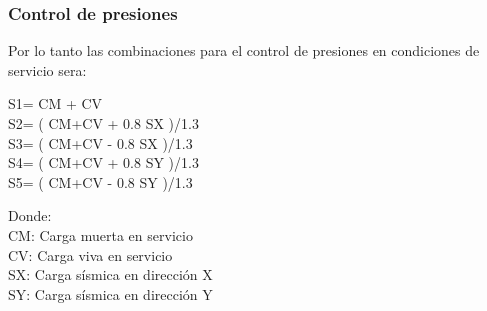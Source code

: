 \documentclass{article}%
\begin{document}
\subsubsection{Control de presiones}
\newpage
\noindent Por lo tanto las combinaciones para el control de presiones en condiciones de servicio sera:
\begin{center}
    S1= CM + CV\\
    S2= ( CM+CV + 0.8 SX )/1.3\\
    S3= ( CM+CV - 0.8 SX )/1.3\\
    S4= ( CM+CV + 0.8 SY )/1.3\\
    S5= ( CM+CV - 0.8 SY )/1.3 
\end{center}
\noindent 
Donde:\\
CM: Carga muerta en servicio\\
CV: Carga viva en servicio\\
SX: Carga sísmica en dirección X\\
SY: Carga sísmica en dirección Y\\

\newpage
\end{document}
